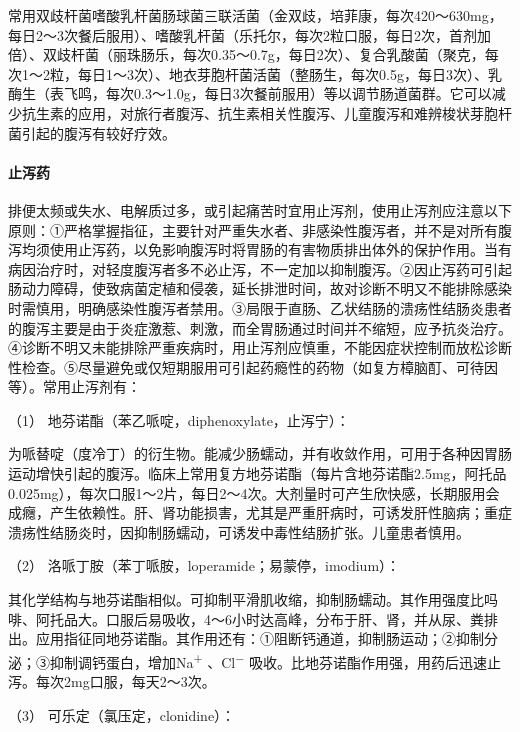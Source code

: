 常用双歧杆菌嗜酸乳杆菌肠球菌三联活菌（金双歧，培菲康，每次420～630mg，每日2～3次餐后服用）、嗜酸乳杆菌（乐托尔，每次2粒口服，每日2次，首剂加倍）、双歧杆菌（丽珠肠乐，每次0.35～0.7g，每日2次）、复合乳酸菌（聚克，每次1～2粒，每日1～3次）、地衣芽胞杆菌活菌（整肠生，每次0.5g，每日3次）、乳酶生（表飞鸣，每次0.3～1.0g，每日3次餐前服用）等以调节肠道菌群。它可以减少抗生素的应用，对旅行者腹泻、抗生素相关性腹泻、儿童腹泻和难辨梭状芽胞杆菌引起的腹泻有较好疗效。

\paragraph{止泻药}

排便太频或失水、电解质过多，或引起痛苦时宜用止泻剂，使用止泻剂应注意以下原则：①严格掌握指征，主要针对严重失水者、非感染性腹泻者，并不是对所有腹泻均须使用止泻药，以免影响腹泻时将胃肠的有害物质排出体外的保护作用。当有病因治疗时，对轻度腹泻者多不必止泻，不一定加以抑制腹泻。②因止泻药可引起肠动力障碍，使致病菌定植和侵袭，延长排泄时间，故对诊断不明又不能排除感染时需慎用，明确感染性腹泻者禁用。③局限于直肠、乙状结肠的溃疡性结肠炎患者的腹泻主要是由于炎症激惹、刺激，而全胃肠通过时间并不缩短，应予抗炎治疗。④诊断不明又未能排除严重疾病时，用止泻剂应慎重，不能因症状控制而放松诊断性检查。⑤尽量避免或仅短期服用可引起药瘾性的药物（如复方樟脑酊、可待因等）。常用止泻剂有：

\hypertarget{text00030.htmlux5cux23CHP1-12-3-2-6-1}{}
（1） 地芬诺酯（苯乙哌啶，diphenoxylate，止泻宁）：

为哌替啶（度冷丁）的衍生物。能减少肠蠕动，并有收敛作用，可用于各种因胃肠运动增快引起的腹泻。临床上常用复方地芬诺酯（每片含地芬诺酯2.5mg，阿托品0.025mg），每次口服1～2片，每日2～4次。大剂量时可产生欣快感，长期服用会成癮，产生依赖性。肝、肾功能损害，尤其是严重肝病时，可诱发肝性脑病；重症溃疡性结肠炎时，因抑制肠蠕动，可诱发中毒性结肠扩张。儿童患者慎用。

\hypertarget{text00030.htmlux5cux23CHP1-12-3-2-6-2}{}
（2） 洛哌丁胺（苯丁哌胺，loperamide；易蒙停，imodium）：

其化学结构与地芬诺酯相似。可抑制平滑肌收缩，抑制肠蠕动。其作用强度比吗啡、阿托品大。口服后易吸收，4～6小时达高峰，分布于肝、肾，并从尿、粪排出。应用指征同地芬诺酯。其作用还有：①阻断钙通道，抑制肠运动；②抑制分泌；③抑制调钙蛋白，增加Na\textsuperscript{+}
、Cl\textsuperscript{−}
吸收。比地芬诺酯作用强，用药后迅速止泻。每次2mg口服，每天2～3次。

\hypertarget{text00030.htmlux5cux23CHP1-12-3-2-6-3}{}
（3） 可乐定（氯压定，clonidine）：

